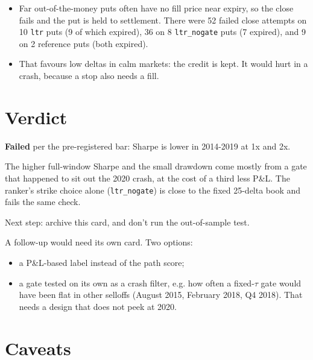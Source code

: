 \documentclass{article}
\begin{document}
\begin{itemize}

\item Far out-of-the-money puts often have no fill price near expiry, so the close fails and the put is held to settlement. There were 52 failed close attempts on 10 \texttt{ltr} puts (9 of which expired), 36 on 8 \texttt{ltr\_\allowbreak{}nogate} puts (7 expired), and 9 on 2 reference puts (both expired).

\item That favours low deltas in calm markets: the credit is kept. It would hurt in a crash, because a stop also needs a fill.

\end{itemize}

\section{Verdict}

\textbf{Failed} per the pre-registered bar: Sharpe is lower in 2014-2019 at 1x and 2x.

The higher full-window Sharpe and the small drawdown come mostly from a gate that happened to sit out the 2020 crash, at the cost of a third less P\&L. The ranker's strike choice alone (\texttt{ltr\_\allowbreak{}nogate}) is close to the fixed 25-delta book and fails the same check.

Next step: archive this card, and don't run the out-of-sample test.

A follow-up would need its own card. Two options:

\begin{itemize}

\item a P\&L-based label instead of the path score;

\item a gate tested on its own as a crash filter, e.g. how often a fixed-$\tau$ gate would have been flat in other selloffs (August 2015, February 2018, Q4 2018). That needs a design that does not peek at 2020.

\end{itemize}

\section{Caveats}
\end{document}
